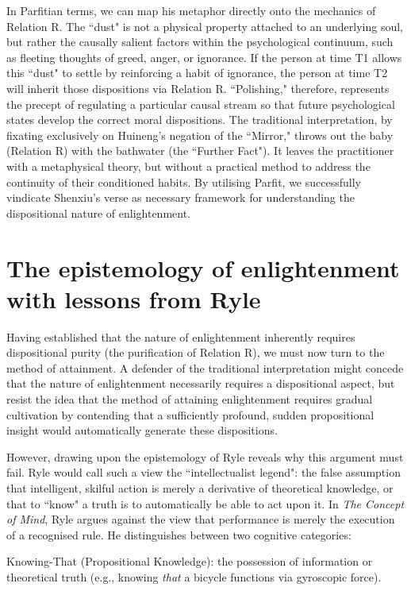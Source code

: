 In Parfitian terms, we can map his metaphor directly onto the mechanics
of Relation R. The ``dust" is not a physical property attached to an
underlying soul, but rather the causally salient factors within the
psychological continuum, such as fleeting thoughts of greed, anger, or
ignorance. If the person at time T1 allows this ``dust" to settle by
reinforcing a habit of ignorance, the person at time T2 will inherit
those dispositions via Relation R. ``Polishing," therefore, represents
the precept of regulating a particular causal stream so that future
psychological states develop the correct moral dispositions. The
traditional interpretation, by fixating exclusively on Huineng's
negation of the ``Mirror," throws out the baby (Relation R) with the
bathwater (the ``Further Fact"). It leaves the practitioner with a
metaphysical theory, but without a practical method to address the
continuity of their conditioned habits. By utilising Parfit, we
successfully vindicate Shenxiu's verse as necessary framework for
understanding the dispositional nature of enlightenment.

\section{The epistemology of enlightenment with lessons from Ryle}

Having established that the nature of enlightenment inherently requires
dispositional purity (the purification of Relation R), we must now turn
to the method of attainment. A defender of the traditional
interpretation might concede that the nature of enlightenment
necessarily requires a dispositional aspect, but resist the idea that
the method of attaining enlightenment requires gradual cultivation by
contending that a sufficiently profound, sudden propositional insight
would automatically generate these dispositions.

However, drawing upon the epistemology of Ryle reveals why this argument
must fail. Ryle would call such a view the ``intellectualist legend": the
false assumption that intelligent, skilful action is merely a derivative
of theoretical knowledge, or that to ``know" a truth is to automatically
be able to act upon it. In \emph{The Concept of Mind}, Ryle argues
against the view that performance is merely the execution of a
recognised rule. He distinguishes between two cognitive categories:

\vspace{0.5em}
\noindent Knowing-That (Propositional Knowledge): the possession of information or
theoretical truth (e.g., knowing \emph{that} a bicycle functions via
gyroscopic force).

